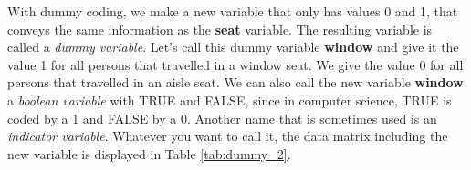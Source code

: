 \begin{kframe}


{\ttfamily\noindent\bfseries{}}

{\ttfamily\noindent\bfseries\color{errorcolor}{\#\# Error in data.frame(person, seat, price): object 'price' not found}}

{\ttfamily\noindent\bfseries{}}\end{kframe}


With dummy coding, we make a new variable that only has values 0 and 1, that conveys the same information as the \textbf{seat} variable. The resulting variable is called a \textit{dummy variable}. Let's call this dummy variable \textbf{window} and give it the value 1 for all persons that travelled in a window seat. We give the value 0 for all persons that travelled in an aisle seat. We can also call the new variable \textbf{window} a \textit{boolean variable} with TRUE and FALSE, since in computer science, TRUE is coded by a 1 and FALSE by a 0. Another name that is sometimes used is an \textit{indicator variable}. Whatever you want to call it, the data matrix including the new variable is displayed in Table \ref{tab:dummy_2}.

\begin{kframe}


{\ttfamily\noindent\bfseries\color{errorcolor}{\#\# Error in data.frame(person, seat, window, price): object 'price' not found}}

{\ttfamily\noindent\bfseries{}}

{\ttfamily\noindent\bfseries\color{errorcolor}{\#\# Error in eval(predvars, data, env): object 'price' not found}}\end{kframe}

















































